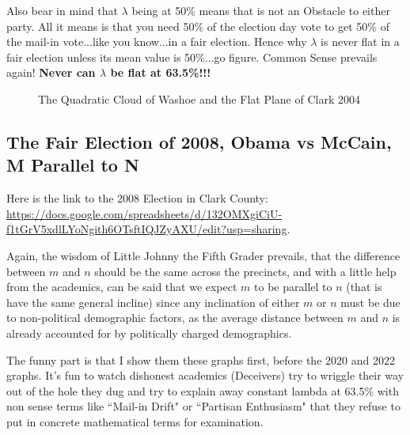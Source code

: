 Also bear in mind that $\lambda$ being at 50\% means that is not an Obstacle to either party. All it means is that you need 50\% of the election day vote to get 50\% of the mail-in vote...like you know...in a fair election. Hence why $\lambda$ is never flat in a fair election unless its mean value is 50\%...go figure. Common Sense prevails again! \textbf{Never can $\lambda$ be flat at 63.5\%!!!}
\begin{figure}[bp!]
\begin{center}
\caption{The Quadratic Cloud of Washoe and the Flat Plane of Clark 2004}
\noindent{}
\end{center}
\end{figure}
\newpage
\subsection{The Fair Election of 2008, Obama vs McCain, M Parallel to N}

Here is the link to the 2008 Election in Clark County: \url{https://docs.google.com/spreadsheets/d/132OMXgiCiU-f1tGrV5xdlLYoNgith6OTsftIQJZyAXU/edit?usp=sharing}.

Again, the wisdom of Little Johnny the Fifth Grader prevails, that the difference between $m$ and $n$ should be the same across the precincts, and with a little help from the academics, can be said that we expect $m$ to be parallel to $n$ (that is have the same general incline) since any inclination of either $m$ or $n$ must be due to non-political demographic factors, as the average distance between $m$ and $n$ is already accounted for by politically charged demographics.

The funny part is that I show them these graphs first, before the 2020 and 2022 graphs. It's fun to watch dishonest academics (Deceivers) try to wriggle their way out of the hole they dug and try to explain away constant lambda at 63.5\% with non sense terms like ``Mail-in Drift" or ``Partisan Enthusiasm" that they refuse to put in concrete mathematical terms for examination.

